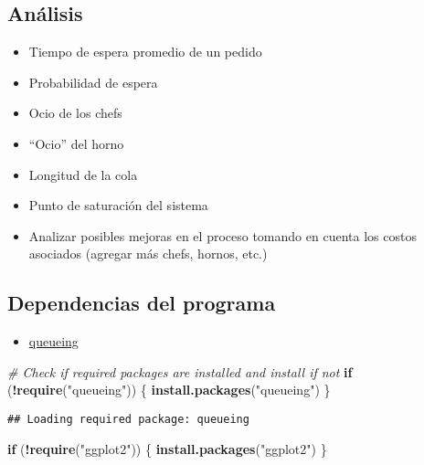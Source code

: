 \documentclass[
]{article}
\newenvironment{Shaded}{\begin{snugshade}}{\end{snugshade}}
\newcommand{\CommentTok}[1]{\textcolor[rgb]{0.56,0.35,0.01}{\textit{#1}}}
\newcommand{\ControlFlowTok}[1]{\textcolor[rgb]{0.13,0.29,0.53}{\textbf{#1}}}
\newcommand{\FunctionTok}[1]{\textcolor[rgb]{0.13,0.29,0.53}{\textbf{#1}}}
\newcommand{\NormalTok}[1]{#1}
\newcommand{\SpecialCharTok}[1]{\textcolor[rgb]{0.81,0.36,0.00}{\textbf{#1}}}
\newcommand{\StringTok}[1]{\textcolor[rgb]{0.31,0.60,0.02}{#1}}
\providecommand{\tightlist}{%
  \setlength{\itemsep}{0pt}\setlength{\parskip}{0pt}}
\begin{document}
\subsection{Análisis}\label{anuxe1lisis}

\begin{itemize}
\tightlist
\item
  Tiempo de espera promedio de un pedido
\item
  Probabilidad de espera
\item
  Ocio de los chefs
\item
  ``Ocio'' del horno
\item
  Longitud de la cola
\item
  Punto de saturación del sistema
\item
  Analizar posibles mejoras en el proceso tomando en cuenta los costos
  asociados (agregar más chefs, hornos, etc.)
\end{itemize}

\subsection{Dependencias del programa}\label{dependencias-del-programa}

\begin{itemize}
\tightlist
\item
  \href{https://www.rdocumentation.org/packages/queueing/versions/0.2.12}{queueing}
\end{itemize}

\begin{Shaded}
\begin{Highlighting}[]
\CommentTok{\# Check if required packages are installed and install if not}
\ControlFlowTok{if}\NormalTok{ (}\SpecialCharTok{!}\FunctionTok{require}\NormalTok{(}\StringTok{"queueing"}\NormalTok{)) \{}
  \FunctionTok{install.packages}\NormalTok{(}\StringTok{"queueing"}\NormalTok{)}
\NormalTok{\}}
\end{Highlighting}
\end{Shaded}

\begin{verbatim}
## Loading required package: queueing
\end{verbatim}

\begin{Shaded}
\begin{Highlighting}[]
\ControlFlowTok{if}\NormalTok{ (}\SpecialCharTok{!}\FunctionTok{require}\NormalTok{(}\StringTok{"ggplot2"}\NormalTok{)) \{}
  \FunctionTok{install.packages}\NormalTok{(}\StringTok{"ggplot2"}\NormalTok{)}
\NormalTok{\}}
\end{Highlighting}
\end{Shaded}
\end{document}
